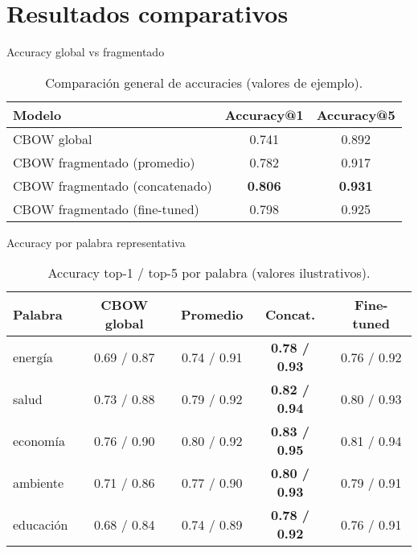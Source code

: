 \documentclass[11pt]{beamer}
\begin{document}
	\section{Resultados comparativos}
	\begin{frame}{Accuracy global vs fragmentado}
		\begin{table}
			\centering
			\begin{tabular}{lcc}
				\toprule
				\textbf{Modelo} & \textbf{Accuracy@1} & \textbf{Accuracy@5} \\
				\midrule
				CBOW global & 0.741 & 0.892 \\
				CBOW fragmentado (promedio) & 0.782 & 0.917 \\
				CBOW fragmentado (concatenado) & \textbf{0.806} & \textbf{0.931} \\
				CBOW fragmentado (fine-tuned) & 0.798 & 0.925 \\
				\bottomrule
			\end{tabular}
			\caption{Comparación general de accuracies (valores de ejemplo).}
		\end{table}
	\end{frame}
	
	\begin{frame}{Accuracy por palabra representativa}
		\begin{table}
			\centering
			\begin{tabular}{lcccc}
				\toprule
				\textbf{Palabra} & \textbf{CBOW global} & \textbf{Promedio} & \textbf{Concat.} & \textbf{Fine-tuned} \\
				\midrule
				energía & 0.69 / 0.87 & 0.74 / 0.91 & \textbf{0.78 / 0.93} & 0.76 / 0.92 \\
				salud & 0.73 / 0.88 & 0.79 / 0.92 & \textbf{0.82 / 0.94} & 0.80 / 0.93 \\
				economía & 0.76 / 0.90 & 0.80 / 0.92 & \textbf{0.83 / 0.95} & 0.81 / 0.94 \\
				ambiente & 0.71 / 0.86 & 0.77 / 0.90 & \textbf{0.80 / 0.93} & 0.79 / 0.91 \\
				educación & 0.68 / 0.84 & 0.74 / 0.89 & \textbf{0.78 / 0.92} & 0.76 / 0.91 \\
				\bottomrule
			\end{tabular}
			\caption{Accuracy top-1 / top-5 por palabra (valores ilustrativos).}
		\end{table}
	\end{frame}
	
\end{document}
